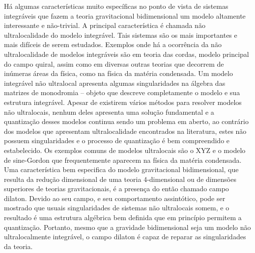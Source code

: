 \documentclass[25pt]{article}
\numberwithin{equation}{subsection} %
\begin{document}
Há algumas características muito específicas no ponto de vista de sistemas integráveis que fazem a teoria gravitacional bidimensional um modelo altamente interessante e não-trivial. A principal característica é chamada não ultralocalidade do modelo integrável. Tais sistemas são os mais importantes e mais difíceis de serem estudados. Exemplos onde há a ocorrência da não ultralocalidade de modelos integráveis são em teoria das cordas, modelo principal do campo quiral, assim como em diversas outras teorias que decorrem de inúmeras áreas da física, como na física da matéria condensada. Um modelo integrável não ultralocal apresenta algumas singularidades na álgebra das matrizes de monodromia – objeto que descreve completamente o modelo e sua estrutura integrável. Apesar de existirem vários métodos para resolver modelos não ultralocais, nenhum deles apresenta uma solução fundamental e a quantização desses modelos continua sendo um problema em aberto, ao contrário dos modelos que apresentam ultralocalidade encontrados na literatura, estes não possuem singularidades e o processo de quantização é bem compreendido e estabelecido. Os exemplos comuns de modelos ultralocais são o XYZ e o modelo de sine-Gordon que frequentemente aparecem na física da matéria condensada. Uma característica bem especifica do modelo gravitacional bidimensional, que resulta da redução dimensional de uma teoria 4-dimensional ou de dimensões superiores de teorias gravitacionais, é a presença do então chamado campo dilaton. Devido ao seu campo, e seu comportamento assintótico, pode ser mostrado que usuais singularidades de sistemas não ultralocais somem, e o resultado é uma estrutura algébrica bem definida que em princípio permitem a quantização. Portanto, mesmo que a gravidade bidimensional seja um modelo não ultralocalmente integrável, o campo dilaton é capaz de reparar as singularidades da teoria.
\end{document}
